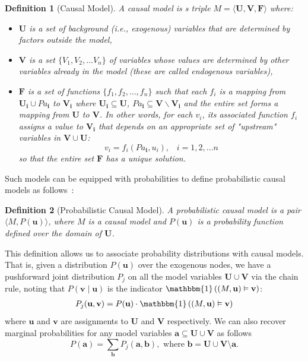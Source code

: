 \documentclass[twoside,11pt]{article}
\newtheorem{definition}{Definition}
\begin{document}
\begin{definition}[Causal Model]
    A causal model is s triple \(M = \langle \mathbf{U}, \mathbf{V}, \mathbf{F} \rangle\) where:
\begin{itemize}
    \item $\mathbf{U}$ is a set of background (i.e., exogenous) variables  that are determined by factors outside the model,
    \item $\mathbf{V}$ is a set \(\{V_1, V_2, \ldots V_n\}\) of  variables whose values are determined by other variables already in the model (these are called endogenous variables),
    \item $\mathbf{F}$ is a set of functions \(\{f_1, f_2, \ldots, f_n\}\) such that each \(f_i\) is a mapping from \(\mathbf{U_i} \cup \mathbf{\mathit{Pa}_i}\) to \(\mathbf{V_i}\) where \(\mathbf{U_i} \subseteq \mathbf{U}\), \(\mathbf{\mathit{Pa}_i} \subseteq \mathbf{V} \backslash \mathbf{V_i}\) and the entire set forms a mapping from $\mathbf{U}$ to $\mathbf{V}$. In other words, for each $v_i$, its associated function  \(f_i\) 
    assigns a value to \(\mathbf{V_i}\) that depends on an appropriate set of "upstream" variables in \(\mathbf{V} \cup \mathbf{U}\): \[v_i = f_i(\mathbf{\mathit{Pa}_i}, u_i), \;\;\; i = 1, 2, \ldots n\]
    so that the entire set \(\mathbf{F}\) has a unique solution.
\end{itemize}
\end{definition}

\noindent Such models can be  equipped with probabilities to define probabilistic causal models as follows~\cite{causalityPearl}:
\begin{definition}[Probabilistic Causal Model]
    A probabilistic causal model is a pair \(\langle M, P(\mathbf{u}) \rangle\), where \(M\) is a causal model and \(P(\mathbf{u})\) is a probability function defined over the domain of \(\mathbf{U}\).
\end{definition}

This definition allows us to associate probability distributions with causal models. That is, given a distribution $P(\mathbf{u})$ over the exogenous nodes, we have a pushforward joint distribution \(P_j\) on all the model variables \(\mathbf{U} \cup \mathbf{V}\) via the chain rule, noting that $P(\mathbf{v} \mid  \mathbf{u})$ is the indicator $\mathbbm{1}\left ( (M, \mathbf{u}) \vDash \mathbf{v}\right)$:
\begin{align} \label{eq:joint} P_j(\mathbf{u}, \mathbf{v}) = P(\mathbf{u}) \cdot \mathbbm{1}\left ( (M, \mathbf{u}) \vDash \mathbf{v}\right)\end{align}
where \(\mathbf{u}\) and \(\mathbf{v}\) are assignments to \(\mathbf{U}\) and \(\mathbf{V}\) respectively. We can also recover marginal probabilities for any model variables $\mathbf{a} \subseteq \mathbf{U}\cup \mathbf{V}$ as follows
\[
P(\mathbf{a}) = \sum_{\mathbf{b}} P_j(\mathbf{a}, \mathbf{b}), \mbox{  where } \mathbf{b} = \mathbf{U}\cup \mathbf{V} \setminus \mathbf{a}.
\]
\end{document}

